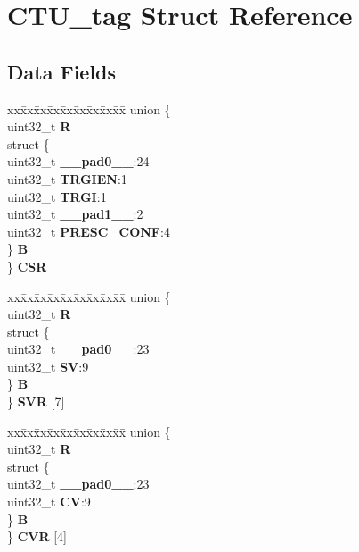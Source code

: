 \hypertarget{structCTU__tag}{}\section{C\+T\+U\+\_\+tag Struct Reference}
\label{structCTU__tag}
\subsection*{Data Fields}
\begin{DoxyCompactItemize}
\item 
\mbox{\label{structCTU__tag_a5ac28b93d9b94db0ac18f3d3578027c6}} 
\begin{tabbing}
xx\=xx\=xx\=xx\=xx\=xx\=xx\=xx\=xx\=\kill
union \{\\
\>uint32\_t {\bfseries R}\\
\>struct \{\\
\>\>uint32\_t {\bfseries \_\_pad0\_\_}:24\\
\>\>uint32\_t {\bfseries TRGIEN}:1\\
\>\>uint32\_t {\bfseries TRGI}:1\\
\>\>uint32\_t {\bfseries \_\_pad1\_\_}:2\\
\>\>uint32\_t {\bfseries PRESC\_CONF}:4\\
\>\} {\bfseries B}\\
\} {\bfseries CSR}\\

\end{tabbing}\item 
\mbox{\label{structCTU__tag_aef9a542fb6aa0eea0ecab934f4988d02}} 
\begin{tabbing}
xx\=xx\=xx\=xx\=xx\=xx\=xx\=xx\=xx\=\kill
union \{\\
\>uint32\_t {\bfseries R}\\
\>struct \{\\
\>\>uint32\_t {\bfseries \_\_pad0\_\_}:23\\
\>\>uint32\_t {\bfseries SV}:9\\
\>\} {\bfseries B}\\
\} {\bfseries SVR} \mbox{[}7\mbox{]}\\

\end{tabbing}\item 
\mbox{\label{structCTU__tag_a78defcd70815eec27e83ef518013a391}} 
\begin{tabbing}
xx\=xx\=xx\=xx\=xx\=xx\=xx\=xx\=xx\=\kill
union \{\\
\>uint32\_t {\bfseries R}\\
\>struct \{\\
\>\>uint32\_t {\bfseries \_\_pad0\_\_}:23\\
\>\>uint32\_t {\bfseries CV}:9\\
\>\} {\bfseries B}\\
\} {\bfseries CVR} \mbox{[}4\mbox{]}\\


\end{tabbing}
\end{DoxyCompactItemize}
